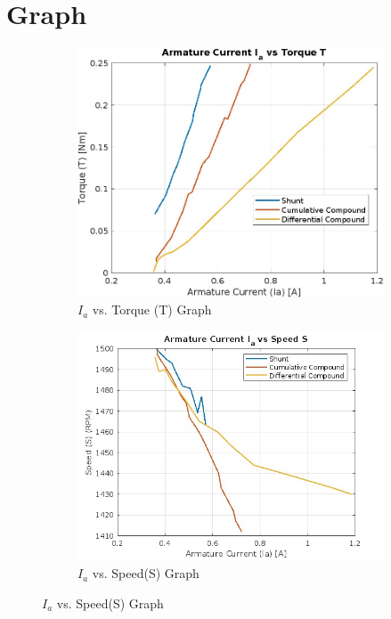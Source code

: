 \documentclass[a4paper,12pt]{article}
\begin{document}
	\section{Graph}
	\begin{figure}[H]
		\centering
		\begin{subfigure}[t]{1\textwidth}
			\centering
			\includegraphics[width=0.85\linewidth]{Images/1.2}
			\caption{ $I_a$ vs. Torque (T) Graph }
			\vspace{0.1cm}
		\end{subfigure}
		
		\begin{subfigure}[t]{1\textwidth}
			\centering
			\includegraphics[width=0.95\linewidth]{Images/2.1}
			\caption{ $I_a$ vs. Speed(S) Graph}
		\end{subfigure}
		
		
	\end{figure}
	
\end{document}
